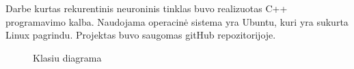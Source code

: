 Darbe kurtas rekurentinis neuroninis tinklas buvo realizuotas C++ programavimo kalba. Naudojama operacinė sistema yra Ubuntu, kuri yra sukurta Linux pagrindu. Projektas buvo saugomas gitHub repozitorijoje.
\clearpage

\begin{figure}[h!]
  \centering
{}
\caption{Klasiu diagrama}
\label{fig:classdiag}
\end{figure}

